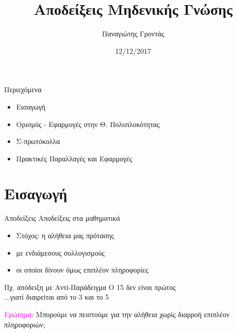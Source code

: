 \documentclass[handout]{beamer}
\title{Αποδείξεις Μηδενικής Γνώσης}
\author{Παναγιώτης Γροντάς}
\date{12/12/2017}
\institute{ΕΜΠ - Κρυπτογραφία - (2017-2018)}
\begin{document}
\newcommand{\xor}{ \oplus }
\newcommand{\msg}{ \mathtt{M} }
\newcommand{\KEY}{ \mathtt{K} }
\newcommand{\CPH}{ \mathtt{C} }
\newcommand{\keygen}{\mathtt{KeyGen}}
\newcommand{\enc}{\mathtt{Encrypt}}
\newcommand{\dec}{\mathtt{Decrypt}}
\newcommand{\sign}{\mathtt{Sign}}
\newcommand{\verify}{\mathtt{Verify}}
\newcommand{\adv}{$\mathcal{A}$}
\newcommand{\Hash}{\mathcal{H} }
\newcommand{\advb}{$\mathcal{B}$}
\newcommand{\chal}{$\mathcal{C}$}
\newcommand{\cs}{$\mathcal{CS}$}
\newcommand{\Zed}{\mathbb{Z}} 
\newcommand{\zns}{\mathbb{Z}^*_n}
\newcommand{\zs}[1]{\mathbb{Z}^*_{#1}}
\newcommand{\prv}{$\mathcal{P}\,$}
\newcommand{\ver}{$\mathcal{V}\,$}
\newcommand{\siml}{$\mathcal{S}\,$}
\newcommand{\green}[1]{\textcolor{teal}{#1}}
\newcommand{\Green}[1]{\textcolor{Teal}{#1}}
\newcommand{\ForestGreen}[1]{\textcolor{ForestGreen}{#1}}
\newcommand{\blue}[1]{\textcolor{blue}{#1}}
\newcommand{\magenta}[1]{\textcolor{magenta}{#1}}
\newcommand{\cyan}[1]{\textcolor{cyan}{#1}}

\newcommand{\twopartdef}[4]
{ 
		\begin{cases}
			#1 , #2 \\
			#3 , #4
		\end{cases} 
}
\begin{frame}
\titlepage
\end{frame}

\begin{frame}{Περιεχόμενα}
\begin{itemize}
\item Εισαγωγή
\pause
\item Ορισμός - Εφαρμογές στην Θ. Πολυπλοκότητας
\pause
\item Σ-πρωτόκολλα
\pause
\item Πρακτικές Παραλλαγές και Εφαρμογές
\end{itemize}
\end{frame}

\section{Εισαγωγή}
\begin{frame}{Αποδείξεις}
Αποδείξεις στα μαθηματικά
\pause
\begin{itemize}
\item Στόχος: η αλήθεια μας πρότασης
\pause
\item με ενδιάμεσους συλλογισμούς
\pause
\item οι οποίοι δίνουν όμως επιπλέον πληροφορίες
\pause
\end{itemize}
\begin{block}{Πχ. απόδειξη με Αντί-Παράδειγμα}
O 15 δεν είναι πρώτος \\
\pause
...γιατί διαιρείται από το 3 και το 5
\end{block}
\pause
\magenta{Ερώτημα}: Μπορούμε να πειστούμε για την αλήθεια χωρίς διαρροή επιπλέον πληροφοριών;
\end{frame}
\end{document}

